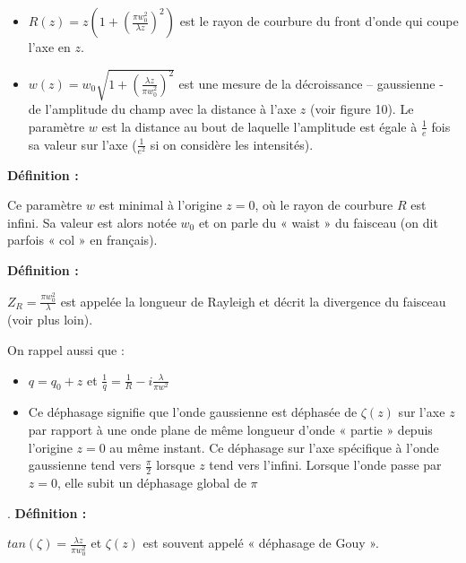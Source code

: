 \documentclass{book}
\begin{document}
\begin{itemize}
    \item $R(z) = z\left(1+\left(\frac{\pi w_0^2}{\lambda z}\right)^2\right)$ est le rayon de courbure du front d'onde qui coupe l'axe en $z$.
    \item $w(z) = w_0 \sqrt{1+\left(\frac{\lambda z}{\pi w_0^2}\right)^2}$ est une mesure de la décroissance – gaussienne - de l'amplitude du champ avec la distance à l'axe $z$ (voir figure 10). Le paramètre $w$ est la distance au bout de laquelle l'amplitude est égale à $\frac 1 e$ fois sa valeur sur l'axe ($\frac 1 {e^2}$ si on considère les intensités).
\end{itemize}


\textbf{\color{definition1}Définition :}  
\begin{mdframed}[linecolor=definition1, backgroundcolor=definition2]

Ce paramètre $w$ est minimal à l'origine $z=0$, où le rayon de courbure $R$ est infini. Sa valeur est alors notée $w_0$ et on parle du « waist » du faisceau (on dit parfois « col » en français).

\end{mdframed}


\textbf{\color{definition1}Définition :}  
\begin{mdframed}[linecolor=definition1, backgroundcolor=definition2]

$Z_R = \frac {\pi w_0^2}{\lambda}$ est appelée la longueur de Rayleigh et décrit la divergence du faisceau (voir plus loin).

\end{mdframed}


On rappel aussi que :
\begin{itemize}
    \item $q=q_0+z$ et $\frac 1 q = \frac 1 R -i \frac \lambda {\pi w^2}$
    \item Ce déphasage signifie que l'onde gaussienne est déphasée de $\zeta (z)$ sur l'axe $z$ par rapport à une onde plane de même longueur d'onde « partie » depuis l'origine $z=0$ au même instant. Ce déphasage sur l'axe spécifique à l'onde gaussienne tend vers $\frac \pi 2$ lorsque $z$ tend vers l'infini. Lorsque l'onde passe par $z=0$, elle subit un déphasage global de $\pi$
\end{itemize}

    .
\textbf{\color{definition1}Définition :}  
\begin{mdframed}[linecolor=definition1, backgroundcolor=definition2]

$tan(\zeta)=\frac {\lambda z}{\pi w_0^2}$ et $\zeta (z)$ est souvent appelé « déphasage de Gouy ». 

\end{mdframed}
\end{document}
